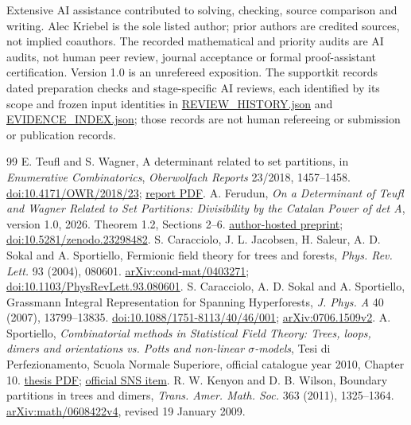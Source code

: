 \documentclass[11pt]{article}
\begin{document}
Extensive AI assistance contributed to solving, checking, source comparison and writing. Alec Kriebel is the sole listed author; prior authors are credited sources, not implied coauthors. The recorded mathematical and priority audits are AI audits, not human peer review, journal acceptance or formal proof-assistant certification. Version 1.0 is an unrefereed exposition. The supportkit records dated preparation checks and stage-specific AI reviews, each identified by its scope and frozen input identities in \url{REVIEW_HISTORY.json} and \url{EVIDENCE_INDEX.json}; those records are not human refereeing or submission or publication records.

\begin{thebibliography}{99}
 E. Teufl and S. Wagner, A determinant related to set partitions, in \emph{Enumerative Combinatorics}, \emph{Oberwolfach Reports} 23/2018, 1457--1458. \href{https://doi.org/10.4171/OWR/2018/23}{doi:10.4171/OWR/2018/23}; \href{https://ems.press/content/serial-article-files/46745}{report PDF}.
 A. Ferudun, \emph{On a Determinant of Teufl and Wagner Related to Set Partitions: Divisibility by the Catalan Power of det A}, version 1.0, 2026. Theorem 1.2, Sections 2--6. \href{https://eulersolve.org/papers/owr-16164-020/}{author-hosted preprint}; \href{https://doi.org/10.5281/zenodo.23298482}{doi:10.5281/zenodo.23298482}.
 S. Caracciolo, J. L. Jacobsen, H. Saleur, A. D. Sokal and A. Sportiello, Fermionic field theory for trees and forests, \emph{Phys. Rev. Lett.} 93 (2004), 080601. \href{https://arxiv.org/abs/cond-mat/0403271}{arXiv:cond-mat/0403271}; \href{https://doi.org/10.1103/PhysRevLett.93.080601}{doi:10.1103/PhysRevLett.93.080601}.
 S. Caracciolo, A. D. Sokal and A. Sportiello, Grassmann Integral Representation for Spanning Hyperforests, \emph{J. Phys. A} 40 (2007), 13799--13835. \href{https://doi.org/10.1088/1751-8113/40/46/001}{doi:10.1088/1751-8113/40/46/001}; \href{https://arxiv.org/pdf/0706.1509v2}{arXiv:0706.1509v2}.
 A. Sportiello, \emph{Combinatorial methods in Statistical Field Theory: Trees, loops, dimers and orientations vs. Potts and non-linear $\sigma$-models}, Tesi di Perfezionamento, Scuola Normale Superiore, official catalogue year 2010, Chapter 10. \href{https://pcteserver.mi.infn.it/~caraccio/PhD/Sportiello.pdf}{thesis PDF}; \href{https://ricerca.sns.it/handle/11384/85875}{official SNS item}.
 R. W. Kenyon and D. B. Wilson, Boundary partitions in trees and dimers, \emph{Trans. Amer. Math. Soc.} 363 (2011), 1325--1364. \href{https://arxiv.org/pdf/math/0608422v4}{arXiv:math/0608422v4}, revised 19 January 2009.

\end{thebibliography}
\end{document}
